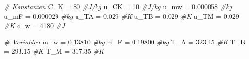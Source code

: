 \documentclass[class=article, crop=false]{standalone}
\newenvironment{Shaded}{\begin{snugshade}}{\end{snugshade}}
\newcommand{\CommentTok}[1]{\textcolor[rgb]{0.56,0.35,0.01}{\textit{#1}}}
\newcommand{\DecValTok}[1]{\textcolor[rgb]{0.00,0.00,0.81}{#1}}
\newcommand{\FloatTok}[1]{\textcolor[rgb]{0.00,0.00,0.81}{#1}}
\newcommand{\NormalTok}[1]{#1}
\newcommand{\OtherTok}[1]{\textcolor[rgb]{0.56,0.35,0.01}{#1}}
\begin{document}
\begin{Shaded}
\begin{Highlighting}[]
\CommentTok{\# Konstanten}
\NormalTok{C\_K }\OtherTok{=} \DecValTok{80} \CommentTok{\#J/kg}
\NormalTok{u\_CK }\OtherTok{=} \DecValTok{10} \CommentTok{\#J/kg}
\NormalTok{u\_mw }\OtherTok{=} \FloatTok{0.000058} \CommentTok{\#kg}
\NormalTok{u\_mF }\OtherTok{=} \FloatTok{0.000029} \CommentTok{\#kg}
\NormalTok{u\_TA }\OtherTok{=} \FloatTok{0.029} \CommentTok{\#K}
\NormalTok{u\_TB }\OtherTok{=} \FloatTok{0.029} \CommentTok{\#K}
\NormalTok{u\_TM }\OtherTok{=} \FloatTok{0.029} \CommentTok{\#K}
\NormalTok{c\_w }\OtherTok{=} \DecValTok{4180} \CommentTok{\#J}

\CommentTok{\# Variablen}
\NormalTok{m\_w }\OtherTok{=} \FloatTok{0.13810} \CommentTok{\#kg}
\NormalTok{m\_F }\OtherTok{=} \FloatTok{0.19800} \CommentTok{\#kg}
\NormalTok{T\_A }\OtherTok{=} \FloatTok{323.15} \CommentTok{\#K}
\NormalTok{T\_B }\OtherTok{=} \FloatTok{293.15} \CommentTok{\#K}
\NormalTok{T\_M }\OtherTok{=} \FloatTok{317.35} \CommentTok{\#K}


\end{Highlighting}
\end{Shaded}
\end{document}
